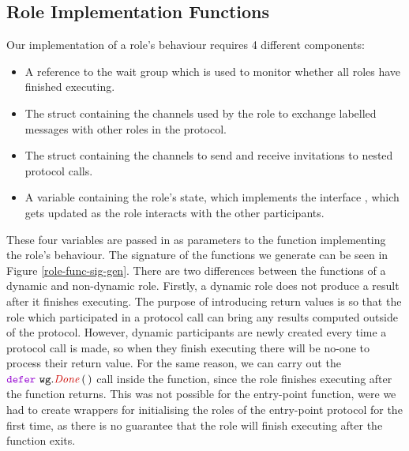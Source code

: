 \documentclass[12pt,twoside]{report}
\begin{document}
\subsection{Role Implementation Functions}
Our implementation of a role's behaviour requires 4 different components: 
\begin{itemize}
    \item A reference to the wait group which is used to monitor whether all roles have finished executing.
    \item The struct containing the channels used by the role to exchange labelled messages with other roles in the protocol.
    \item The struct containing the channels to send and receive invitations to nested protocol calls.
    \item A variable containing the role's state, which implements the interface {\color{dkyellow} \textit{}}, which gets updated as the role interacts with the other participants.
\end{itemize}

These four variables are passed in as parameters to the function implementing the role's behaviour. The signature of the functions we generate can be seen in Figure \ref{role-func-sig-gen}. There are two differences between the functions of a dynamic and non-dynamic role. Firstly, a dynamic role does not produce a result after it finishes executing. The purpose of introducing return values is so that the role which participated in a protocol call can bring any results computed outside of the protocol. However, dynamic participants are newly created every time a protocol call is made, so when they finish executing there will be no-one to process their return value. For the same reason, we can carry out the $\godefer\ \methodcall{wg}{Done}\,(\,)$ call inside the function, since the role finishes executing after the function returns. This was not possible for the entry-point function, were we had to create wrappers for initialising the roles of the entry-point protocol for the first time, as there is no guarantee that the role will finish executing after the function exits. 
\end{document}
